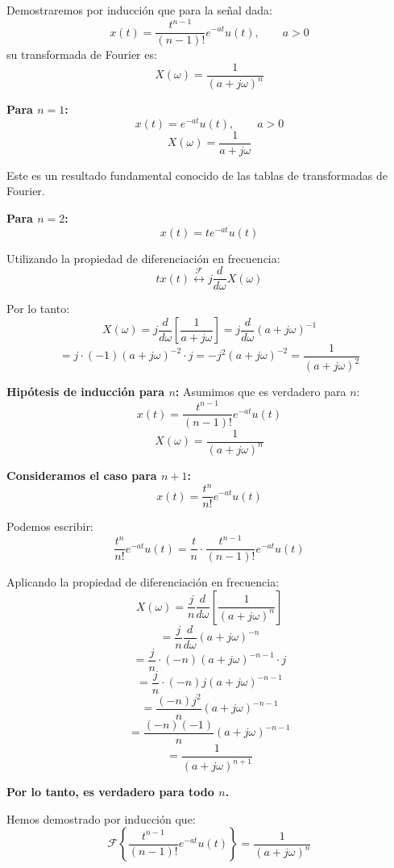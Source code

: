 \documentclass[
  11pt,
  letterpaper,
   addpoints,
   answers
  ]{exam}
\begin{document}
\begin{questions}
\begin{solution}
Demostraremos por inducción que para la señal dada:
$$x(t) = \frac{t^{n-1}}{(n-1)!}e^{-at}u(t), \qquad a > 0$$
su transformada de Fourier es:
$$X(\omega) = \frac{1}{(a + j\omega)^n}$$

\textbf{Para $n = 1$:}
$$x(t) = e^{-at}u(t), \qquad a > 0$$
$$X(\omega) = \frac{1}{a + j\omega}$$

Este es un resultado fundamental conocido de las tablas de transformadas de Fourier.

\textbf{Para $n = 2$:}
$$x(t) = te^{-at}u(t)$$

Utilizando la propiedad de diferenciación en frecuencia:
$$tx(t) \stackrel{\mathcal{F}}{\longleftrightarrow} j\frac{d}{d\omega}X(\omega)$$

Por lo tanto:
$$X(\omega) = j\frac{d}{d\omega}\left[\frac{1}{a + j\omega}\right] = j\frac{d}{d\omega}(a + j\omega)^{-1}$$
$$= j \cdot (-1)(a + j\omega)^{-2} \cdot j = -j^2(a + j\omega)^{-2} = \frac{1}{(a + j\omega)^2}$$

\textbf{Hipótesis de inducción para $n$:}
Asumimos que es verdadero para $n$:
$$x(t) = \frac{t^{n-1}}{(n-1)!}e^{-at}u(t)$$
$$X(\omega) = \frac{1}{(a + j\omega)^n}$$

\textbf{Consideramos el caso para $n + 1$:}
$$x(t) = \frac{t^n}{n!}e^{-at}u(t)$$

Podemos escribir:
$$\frac{t^n}{n!}e^{-at}u(t) = \frac{t}{n} \cdot \frac{t^{n-1}}{(n-1)!}e^{-at}u(t)$$

Aplicando la propiedad de diferenciación en frecuencia:
$$X(\omega) = \frac{j}{n}\frac{d}{d\omega}\left[\frac{1}{(a + j\omega)^n}\right]$$
$$= \frac{j}{n}\frac{d}{d\omega}(a + j\omega)^{-n}$$
$$= \frac{j}{n} \cdot (-n)(a + j\omega)^{-n-1} \cdot j$$
$$= \frac{j}{n} \cdot (-n)j(a + j\omega)^{-n-1}$$
$$= \frac{(-n)j^2}{n}(a + j\omega)^{-n-1}$$
$$= \frac{(-n)(-1)}{n}(a + j\omega)^{-n-1}$$
$$= \frac{1}{(a + j\omega)^{n+1}}$$

\textbf{Por lo tanto, es verdadero para todo $n$.}

Hemos demostrado por inducción que:
$$\boxed{\mathcal{F}\left\{\frac{t^{n-1}}{(n-1)!}e^{-at}u(t)\right\} = \frac{1}{(a + j\omega)^n}}$$
\end{solution}
\end{questions}
\end{document}
